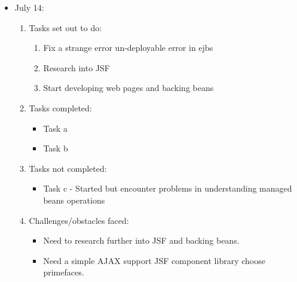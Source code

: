 \documentclass[12pt]{article}
\begin{document}
	\begin{itemize}
		\item July 14:
		\begin{enumerate}
			\item Tasks set out to do:
			\begin{enumerate}
				\item Fix a strange error un-deployable error in ejbs
				\item Research into JSF
				\item Start developing web pages and backing beans				
			\end{enumerate}
			\item Tasks completed:
			\begin{itemize}
				\item Task a
				\item Task b								
			\end{itemize}
			\item Tasks not completed:
			\begin{itemize}
				\item Task c - Started but encounter problems in understanding managed beans operations
			\end{itemize}
			\item Challenges/obstacles faced:
			\begin{itemize}
				\item Need to research further into JSF and backing beans.
				\item Need a simple AJAX support JSF component library choose primefaces.
			\end{itemize}			
		\end{enumerate}
	\end{itemize}
\end{document}
